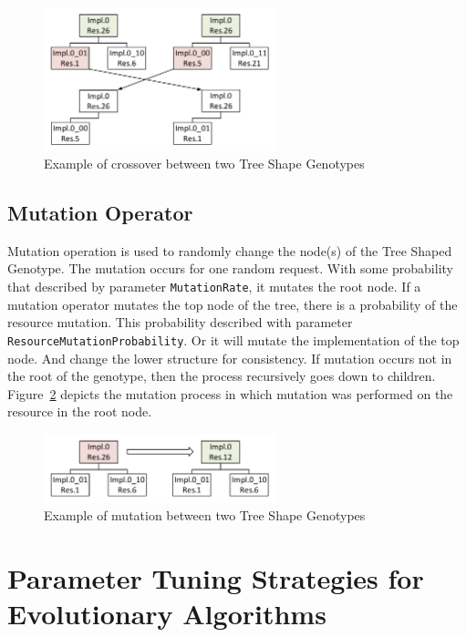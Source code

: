 \begin{figure}
	\centering
	\includegraphics[width=0.6\textwidth]{images/GeneticSolverCrossover.pdf}
	\caption[Crossover in Tree Shape Genotype]{Example of crossover between two Tree Shape Genotypes}
	\label{fig:GeneticSolverCrossover}
\end{figure}



\subsection{Mutation Operator}
\label{sec:GeneticSolverMutation}
Mutation operation is used to randomly change the node(s) of the Tree Shaped Genotype.
The mutation occurs for one random request. With some probability that described by parameter \texttt{MutationRate}, it mutates the root node. If a mutation operator mutates the top node of the tree, there is a probability of the resource mutation. This probability described with parameter \texttt{ResourceMutationProbability}. Or it will mutate the implementation of the top node. And change the lower structure for consistency. If mutation occurs not in the root of the genotype, then the process recursively goes down to children.  Figure~\ref{fig:GeneticSolverMutation} depicts the mutation process in which mutation was performed on the resource 
in the root node.

\begin{figure}
	\centering
	\includegraphics[width=0.6\textwidth]{images/GeneticSolverMutation.pdf}
	\caption[Mutation in Tree Shape Genotype]{Example of mutation between two Tree Shape Genotypes}
	\label{fig:GeneticSolverMutation}
\end{figure}

\section{Parameter Tuning Strategies for Evolutionary Algorithms}\label{sec:Parameter Tuning Strategies}

